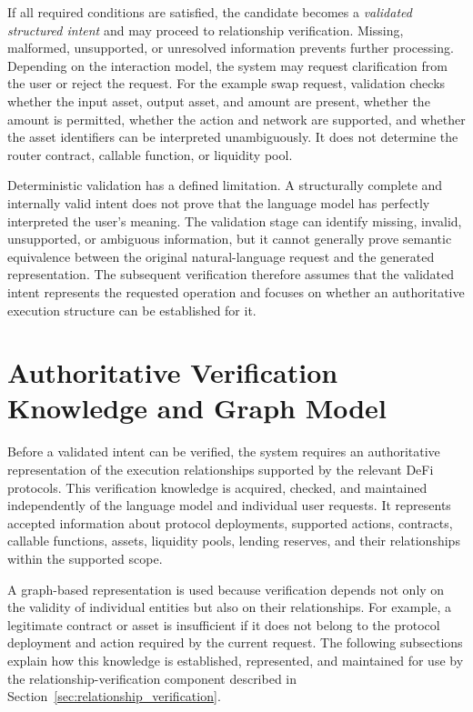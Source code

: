 If all required conditions are satisfied, the candidate becomes a
\textit{validated structured intent} and may proceed to relationship
verification. Missing, malformed, unsupported, or unresolved information
prevents further processing. Depending on the interaction model, the system may
request clarification from the user or reject the request. For the example swap request, validation checks whether the input asset, output
asset, and amount are present, whether the amount is permitted, whether the
action and network are supported, and whether the asset identifiers can be
interpreted unambiguously. It does not determine the router contract, callable
function, or liquidity pool.

Deterministic validation has a defined limitation. A structurally complete and
internally valid intent does not prove that the language model has perfectly
interpreted the user's meaning. The validation stage can identify missing,
invalid, unsupported, or ambiguous information, but it cannot generally prove
semantic equivalence between the original natural-language request and the
generated representation. The subsequent verification therefore assumes that
the validated intent represents the requested operation and focuses on whether
an authoritative execution structure can be established for it.



\section{Authoritative Verification Knowledge and Graph Model}
\label{sec:verification_knowledge}

Before a validated intent can be verified, the system requires an
authoritative representation of the execution relationships supported by
the relevant DeFi protocols. This verification knowledge is acquired,
checked, and maintained independently of the language model and individual
user requests. It represents accepted information about protocol deployments,
supported actions, contracts, callable functions, assets, liquidity pools,
lending reserves, and their relationships within the supported scope.

A graph-based representation is used because verification depends not only
on the validity of individual entities but also on their relationships.
For example, a legitimate contract or asset is insufficient if it does
not belong to the protocol deployment and action required by the current
request. The following subsections explain how this knowledge is established,
represented, and maintained for use by the relationship-verification component
described in Section~\ref{sec:relationship_verification}.

